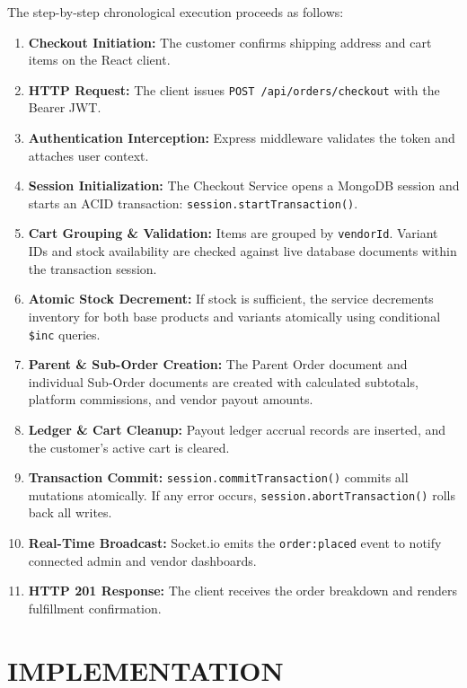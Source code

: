 \documentclass[12pt,a4paper]{report}
\begin{document}
The step-by-step chronological execution proceeds as follows:
\begin{enumerate}[leftmargin=1.5cm]
    \item \textbf{Checkout Initiation:} The customer confirms shipping address and cart items on the React client.
    \item \textbf{HTTP Request:} The client issues \texttt{POST /api/orders/checkout} with the Bearer JWT.
    \item \textbf{Authentication Interception:} Express middleware validates the token and attaches user context.
    \item \textbf{Session Initialization:} The Checkout Service opens a MongoDB session and starts an ACID transaction: \texttt{session.startTransaction()}.
    \item \textbf{Cart Grouping \& Validation:} Items are grouped by \texttt{vendorId}. Variant IDs and stock availability are checked against live database documents within the transaction session.
    \item \textbf{Atomic Stock Decrement:} If stock is sufficient, the service decrements inventory for both base products and variants atomically using conditional \texttt{\$inc} queries.
    \item \textbf{Parent \& Sub-Order Creation:} The Parent Order document and individual Sub-Order documents are created with calculated subtotals, platform commissions, and vendor payout amounts.
    \item \textbf{Ledger \& Cart Cleanup:} Payout ledger accrual records are inserted, and the customer's active cart is cleared.
    \item \textbf{Transaction Commit:} \texttt{session.commitTransaction()} commits all mutations atomically. If any error occurs, \texttt{session.abortTransaction()} rolls back all writes.
    \item \textbf{Real-Time Broadcast:} Socket.io emits the \texttt{order:placed} event to notify connected admin and vendor dashboards.
    \item \textbf{HTTP 201 Response:} The client receives the order breakdown and renders fulfillment confirmation.
\end{enumerate}

\chapter{IMPLEMENTATION}
\end{document}
